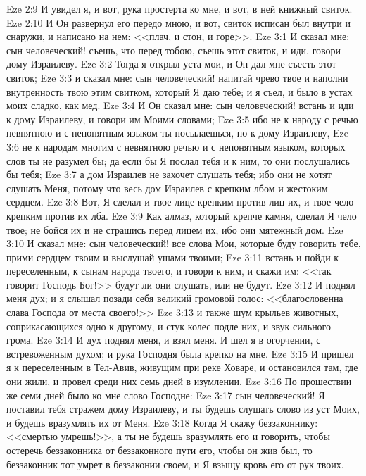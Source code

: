 \vs Eze 2:9 И увидел я, и вот, рука простерта ко мне, и вот, в ней книжный свиток.
\vs Eze 2:10 И Он развернул его передо мною, и вот, свиток исписан был внутри и снаружи, и написано на нем: <<плач, и стон, и горе>>.
\vs Eze 3:1 И сказал мне: сын человеческий! съешь, что перед тобою, съешь этот свиток, и иди, говори дому Израилеву.
\vs Eze 3:2 Тогда я открыл уста мои, и Он дал мне съесть этот свиток;
\vs Eze 3:3 и сказал мне: сын человеческий! напитай чрево твое и наполни внутренность твою этим свитком, который Я даю тебе; и я съел, и было в устах моих сладко, как мед.
\vs Eze 3:4 И Он сказал мне: сын человеческий! встань и иди к дому Израилеву, и говори им Моими словами;
\vs Eze 3:5 ибо не к народу с речью невнятною и с непонятным языком ты посылаешься, но к дому Израилеву,
\vs Eze 3:6 не к народам многим с невнятною речью и с непонятным языком, которых слов ты не разумел бы; да если бы Я послал тебя и к ним, то они послушались бы тебя;
\vs Eze 3:7 а дом Израилев не захочет слушать тебя; ибо они не хотят слушать Меня, потому что весь дом Израилев с крепким лбом и жестоким сердцем.
\vs Eze 3:8 Вот, Я сделал и твое лице крепким против лиц их, и твое чело крепким против их лба.
\vs Eze 3:9 Как алмаз, который крепче камня, сделал Я чело твое; не бойся их и не страшись перед лицем их, ибо они мятежный дом.
\vs Eze 3:10 И сказал мне: сын человеческий! все слова Мои, которые буду говорить тебе, прими сердцем твоим и выслушай ушами твоими;
\vs Eze 3:11 встань и пойди к переселенным, к сынам народа твоего, и говори к ним, и скажи им: <<так говорит Господь Бог!>> будут ли они слушать, или не будут.
\vs Eze 3:12 И поднял меня дух; и я слышал позади себя великий громовой голос: <<благословенна слава Господа от места своего!>>
\vs Eze 3:13 и также шум крыльев животных, соприкасающихся одно к другому, и стук колес подле них, и звук сильного грома.
\vs Eze 3:14 И дух поднял меня, и взял меня. И шел я в огорчении, с встревоженным духом; и рука Господня была крепко на мне.
\vs Eze 3:15 И пришел я к переселенным в Тел-Авив, живущим при реке Ховаре, и остановился там, где они жили, и провел среди них семь дней в изумлении.
\rsbpar\vs Eze 3:16 По прошествии же семи дней было ко мне слово Господне:
\vs Eze 3:17 сын человеческий! Я поставил тебя стражем дому Израилеву, и ты будешь слушать слово из уст Моих, и будешь вразумлять их от Меня.
\vs Eze 3:18 Когда Я скажу беззаконнику: <<смертью умрешь!>>, а ты не будешь вразумлять его и говорить, чтобы остеречь беззаконника от беззаконного пути его, чтобы он жив был, то беззаконник тот умрет в беззаконии своем, и Я взыщу кровь его от рук твоих.
